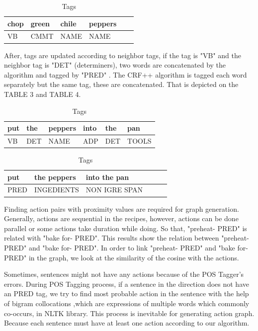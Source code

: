 \begin{table}[]
\centering
\caption{Tags}
\label{my-label}
\begin{tabular}{|l|l|l|l|l|l|}
\hline
chop & green & chile & peppers \\ \hline
VB     & CMMT    & NAME    & NAME      \\ \hline
\end{tabular}
\end{table}

 After, tags are updated according to neighbor tags, if the tag is "VB" and the neighbor tag is "DET" (determiners), two words are concatenated by the algorithm and tagged by "PRED" . The CRF++ algorithm is tagged each word separately but  the same tag,    these are concatenated. That is depicted on the TABLE 3 and TABLE 4. 
 
 \begin{table}[]
\centering
\caption{Tags}
\label{my-label}
\begin{tabular}{|l|l|l|l|l|l|}
\hline
put    & the     &  peppers  & into  & the    & pan \\ \hline
VB    & DET   & NAME     & ADP & DET & TOOLS      \\ \hline
\end{tabular}
\end{table}

 \begin{table}[]
\centering
\caption{Tags}
\label{my-label}
\begin{tabular}{|l|l|l|l|l|l|}
\hline
put       &  the peppers       & into  the pan \\ \hline
PRED  & INGEDIENTS & NON IGRE SPAN  \\ \hline
\end{tabular}
\end{table}

Finding action pairs with proximity values are required for graph generation. Generally, actions are sequential in the recipes, however, actions can be done  parallel or some actions take duration while doing. So that, "preheat- PRED" is related with "bake for- PRED". This results show the relation between "preheat- PRED" and "bake for- PRED". In order to link "preheat- PRED"  and  "bake for- PRED" in the graph,  we look at the similarity of the cosine with the actions. 

Sometimes, sentences might not have any actions because of the POS Tagger's errors. During POS Tagging process, if a sentence in the direction does not have an PRED tag, we try to find most probable action in the sentence with the help of bigram collocations ,which are expressions of multiple words which commonly co-occurs, in NLTK library. This process is inevitable for generating action graph. Because each sentence must have at least one action according to our algorithm. 


